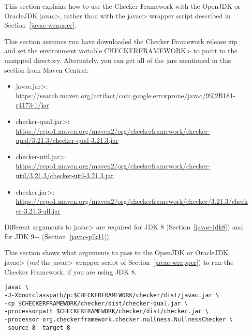 
This section explains how to use the Checker Framework with the OpenJDK or
OracleJDK \<javac>, rather than with the \<javac> wrapper script described in
Section~\ref{javac-wrapper}.

This
section assumes you have downloaded the Checker Framework release zip and set
the environment variable \<CHECKERFRAMEWORK> to point to the unzipped directory.
Alternately, you can get all of the jars mentioned in this section from Maven Central:

\begin{itemize}
\item \<javac.jar>: \url{https://search.maven.org/artifact/com.google.errorprone/javac/9%2B181-r4173-1/jar}
\item \<checker-qual.jar>: \url{https://repo1.maven.org/maven2/org/checkerframework/checker-qual/3.21.3/checker-qual-3.21.3.jar}
\item \<checker-util.jar>: \url{https://repo1.maven.org/maven2/org/checkerframework/checker-util/3.21.3/checker-util-3.21.3.jar}
\item \<checker.jar>: \url{https://repo1.maven.org/maven2/org/checkerframework/checker/3.21.3/checker-3.21.3-all.jar}
\end{itemize}

Different arguments to \<javac> are required for JDK 8
(Section~\ref{javac-jdk8}) and for JDK 9+ (Section~\ref{javac-jdk11}).



This section shows what arguments to pass to the OpenJDK or OracleJDK
\<javac> (\emph{not} the \<javac> wrapper script of
Section~\ref{javac-wrapper}) to run the Checker
Framework, if you are using JDK 8.

\begin{Verbatim}
javac \
-J-Xbootclasspath/p:$CHECKERFRAMEWORK/checker/dist/javac.jar \
-cp $CHECKERFRAMEWORK/checker/dist/checker-qual.jar \
-processorpath $CHECKERFRAMEWORK/checker/dist/checker.jar \
-processor org.checkerframework.checker.nullness.NullnessChecker \
-source 8 -target 8
\end{Verbatim}

